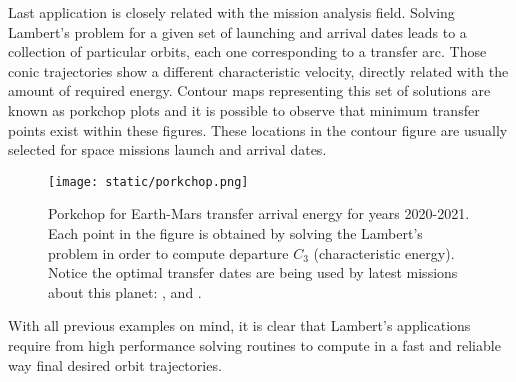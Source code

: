 Last application is closely related with the mission analysis field. Solving
Lambert's problem for a given set of launching and arrival dates leads to a
collection of particular orbits, each one corresponding to a transfer arc.
Those conic trajectories show a different characteristic velocity, directly
related with the amount of required energy.  Contour maps representing this set
of solutions are known as porkchop plots and it is possible to observe that minimum
transfer points exist within these figures.  These locations in the contour
figure are usually selected for space missions launch and arrival dates.

\begin{figure}[h]
  \centering
  \texttt{[image: static/porkchop.png]}
  \caption{Porkchop for Earth-Mars transfer arrival energy for years 2020-2021.
    Each point in the figure is obtained by solving the Lambert's problem in order
    to compute departure $C_{3}$ (characteristic energy). Notice the optimal
    transfer dates are being used by latest missions about this planet:
    \cite{perseverance2020}, \cite{tianwen1} and \cite{hope2021}.}
  \label{fig:porkchop_perseverance}
\end{figure}

With all previous examples on mind, it is clear that Lambert's applications
require from high performance solving routines to compute in a fast and reliable
way final desired orbit trajectories.
